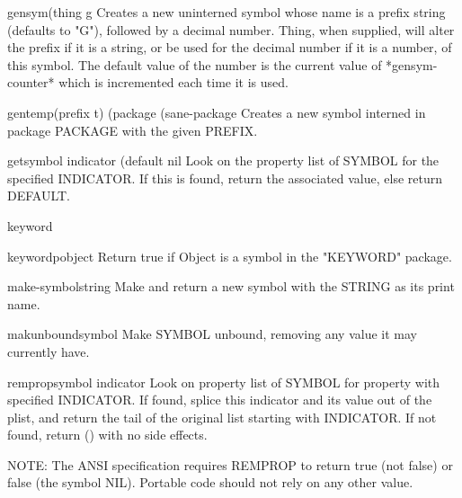 \begin{function}{gensym}{\op (thing g}{}
  Creates a new uninterned symbol whose name is a prefix string (defaults
   to "G"), followed by a decimal number. Thing, when supplied, will
   alter the prefix if it is a string, or be used for the decimal number
   if it is a number, of this symbol. The default value of the number is
   the current value of *gensym-counter* which is incremented each time
   it is used.
\end{function}

\begin{function}{gentemp}{\op (prefix t) (package (sane-package}{}
  Creates a new symbol interned in package PACKAGE with the given PREFIX.
\end{function}

\begin{accessor}{get}{symbol indicator \op (default nil}{}
  Look on the property list of SYMBOL for the specified INDICATOR. If this
  is found, return the associated value, else return DEFAULT.
\end{accessor}

\begin{type}{keyword}{}{}
  
\end{type}

\begin{function}{keywordp}{object}{}
  Return true if Object is a symbol in the "KEYWORD" package.
\end{function}

\begin{function}{make-symbol}{string}{}
  Make and return a new symbol with the STRING as its print name.
\end{function}

\begin{function}{makunbound}{symbol}{}
  Make SYMBOL unbound, removing any value it may currently have.
\end{function}

\begin{function}{remprop}{symbol indicator}{}
  Look on property list of SYMBOL for property with specified
  INDICATOR. If found, splice this indicator and its value out of
  the plist, and return the tail of the original list starting with
  INDICATOR. If not found, return () with no side effects.

  NOTE: The ANSI specification requires REMPROP to return true (not false)
  or false (the symbol NIL). Portable code should not rely on any other value.
\end{function}

